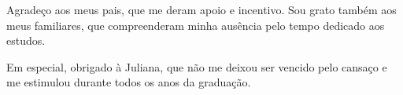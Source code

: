 \begin{agradecimentos}
    Agradeço aos meus pais, que me deram apoio e incentivo. Sou grato também aos meus familiares, que compreenderam minha ausência pelo tempo dedicado aos estudos.

    Em especial, obrigado à Juliana, que não me deixou ser vencido pelo cansaço e me estimulou durante todos os anos da graduação.
\end{agradecimentos}
